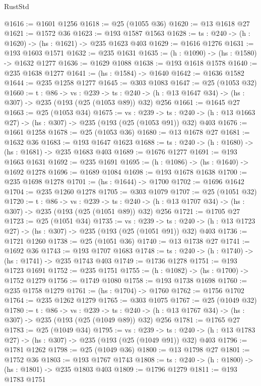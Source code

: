 \begin{lexlean}{RustStd}
\begin{coremodule}
@1616 := @1601 @1256
@1618 := @25 (@1055 @36)
@1620 := @13 @1618 @27
@1621 := @1572 @36
@1623 := @193 @1587 @1563
@1628 := {ts : @240} -> (h : @1620) -> (hs : @1621) -> @235 @1623 @403
@1629 := @1616 @1276
@1631 := @193 @1603 @1571
@1632 := @235 @1631
@1635 := (h : @1090) -> (hs : @1580) -> @1632 @1277
@1636 := @1629 @1088
@1638 := @193 @1618 @1578
@1640 := @235 @1638 @1277
@1641 := (hs : @1584) -> @1640
@1642 := @1636 @1582
@1644 := @235 @1258 @1277
@1645 := @303 @1083
@1647 := @25 (@1053 @32)
@1660 := {t : @86} ->
  {vs : @239} ->
  {ts : @240} -> (h : @13 @1647 @34) -> (hs : @307) -> @235 (@193 (@25 (@1053 @89)) @32) @256
@1661 := @1645 @27
@1663 := @25 (@1053 @34)
@1675 := {vs : @239} ->
  {ts : @240} -> (h : @13 @1663 @27) -> (hs : @307) -> @235 (@193 (@25 (@1053 @91)) @32) @403
@1676 := @1661 @1258
@1678 := @25 (@1053 @36)
@1680 := @13 @1678 @27
@1681 := @1632 @36
@1683 := @193 @1647 @1623
@1688 := {ts : @240} -> (h : @1680) -> (hs : @1681) -> @235 @1683 @403
@1689 := @1676 @1277
@1691 := @193 @1663 @1631
@1692 := @235 @1691
@1695 := (h : @1086) -> (hs : @1640) -> @1692 @1278
@1696 := @1689 @1084
@1698 := @193 @1678 @1638
@1700 := @235 @1698 @1278
@1701 := (hs : @1644) -> @1700
@1702 := @1696 @1642
@1704 := @235 @1260 @1278
@1705 := @303 @1079
@1707 := @25 (@1051 @32)
@1720 := {t : @86} ->
  {vs : @239} ->
  {ts : @240} -> (h : @13 @1707 @34) -> (hs : @307) -> @235 (@193 (@25 (@1051 @89)) @32) @256
@1721 := @1705 @27
@1723 := @25 (@1051 @34)
@1735 := {vs : @239} ->
  {ts : @240} -> (h : @13 @1723 @27) -> (hs : @307) -> @235 (@193 (@25 (@1051 @91)) @32) @403
@1736 := @1721 @1260
@1738 := @25 (@1051 @36)
@1740 := @13 @1738 @27
@1741 := @1692 @36
@1743 := @193 @1707 @1683
@1748 := {ts : @240} -> (h : @1740) -> (hs : @1741) -> @235 @1743 @403
@1749 := @1736 @1278
@1751 := @193 @1723 @1691
@1752 := @235 @1751
@1755 := (h : @1082) -> (hs : @1700) -> @1752 @1279
@1756 := @1749 @1080
@1758 := @193 @1738 @1698
@1760 := @235 @1758 @1279
@1761 := (hs : @1704) -> @1760
@1762 := @1756 @1702
@1764 := @235 @1262 @1279
@1765 := @303 @1075
@1767 := @25 (@1049 @32)
@1780 := {t : @86} ->
  {vs : @239} ->
  {ts : @240} -> (h : @13 @1767 @34) -> (hs : @307) -> @235 (@193 (@25 (@1049 @89)) @32) @256
@1781 := @1765 @27
@1783 := @25 (@1049 @34)
@1795 := {vs : @239} ->
  {ts : @240} -> (h : @13 @1783 @27) -> (hs : @307) -> @235 (@193 (@25 (@1049 @91)) @32) @403
@1796 := @1781 @1262
@1798 := @25 (@1049 @36)
@1800 := @13 @1798 @27
@1801 := @1752 @36
@1803 := @193 @1767 @1743
@1808 := {ts : @240} -> (h : @1800) -> (hs : @1801) -> @235 @1803 @403
@1809 := @1796 @1279
@1811 := @193 @1783 @1751

\end{coremodule}
\end{lexlean}
